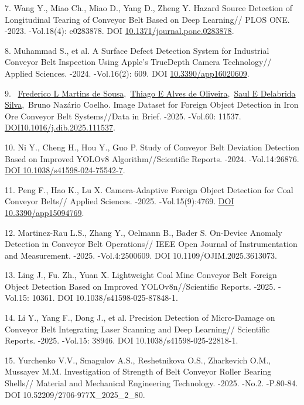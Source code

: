 \begin{refs}
7. Wang Y., Miao Ch., Miao D., Yang D., Zheng Y. Hazard Source Detection
of Longitudinal Tearing of Conveyor Belt Based on Deep Learning// PLOS
ONE. -2023. -Vol.18(4): e0283878. DOI
\href{https://doi.org/10.1371/journal.pone.0283878}{10.1371/journal.pone.0283878}.

8. Muhammad S., et al. A Surface Defect Detection System for Industrial
Conveyor Belt Inspection Using Apple's TrueDepth Camera Technology//
Applied Sciences. -2024. -Vol.16(2): 609. DOI
\href{https://doi.org/10.3390/app16020609}{10.3390/app16020609}.

9. ~\href{https://pubmed.ncbi.nlm.nih.gov/?term=Martins+de+Sousa+FL&cauthor_id=40534719}{Frederico
L Martins de
Sousa}\tsp{~},~\href{https://pubmed.ncbi.nlm.nih.gov/?term=Alves+de+Oliveira+TE&cauthor_id=40534719}{Thiago
E Alves de
Oliveira}\tsp{~},~\href{https://pubmed.ncbi.nlm.nih.gov/?term=Delabrida+Silva+SE&cauthor_id=40534719}{Saul
E Delabrida Silva}\tsp{~},~Bruno Nazário Coelho. Image
Dataset for Foreign Object Detection in Iron Ore Conveyor Belt
Systems//Data in Brief. -2025. -Vol.60: 11537.
\href{https://doi.org/10.1016/j.dib.2025.111537}{DOI10.1016/j.dib.2025.111537}.

10. Ni Y., Cheng H., Hou Y., Guo P. Study of Conveyor Belt Deviation
Detection Based on Improved YOLOv8 Algorithm//Scientific Reports. -2024.
-Vol.14:26876. \href{https://doi.org/10.1038/s41598-024-75542-7}{DOI
10.1038/s41598-024-75542-7}.

11. Peng F., Hao K., Lu X. Camera-Adaptive Foreign Object Detection for
Coal Conveyor Belts// Applied Sciences. -2025. -Vol.15(9):4769.
\href{https://doi.org/10.3390/app15094769}{DOI 10.3390/app15094769}.

12. Martinez-Rau L.S., Zhang Y., Oelmann B., Bader S. On-Device Anomaly
Detection in Conveyor Belt Operations// IEEE Open Journal of
Instrumentation and Measurement. -2025. -Vol.4:2500609. DOI
10.1109/OJIM.2025.3613073.

13. Ling J., Fu. Zh., Yuan X. Lightweight Coal Mine Conveyor Belt
Foreign Object Detection Based on Improved YOLOv8n//Scientific Reports.
-2025. -Vol.15: 10361. DOI 10.1038/s41598-025-87848-1.

14. Li Y., Yang F., Dong J., et al. Precision Detection of Micro-Damage
on Conveyor Belt Integrating Laser Scanning and Deep Learning//
Scientific Reports. -2025. -Vol.15: 38946. DOI
10.1038/s41598-025-22818-1.

15. Yurchenko V.V., Smagulov A.S., Reshetnikova O.S., Zharkevich O.M.,
Mussayev M.M. Investigation of Strength of Belt Conveyor Roller Bearing
Shells// Material and Mechanical Engineering Technology. -2025. -No.2.
-P.80-84. DOI 10.52209/2706-977X\_2025\_2\_80.
\end{refs}

